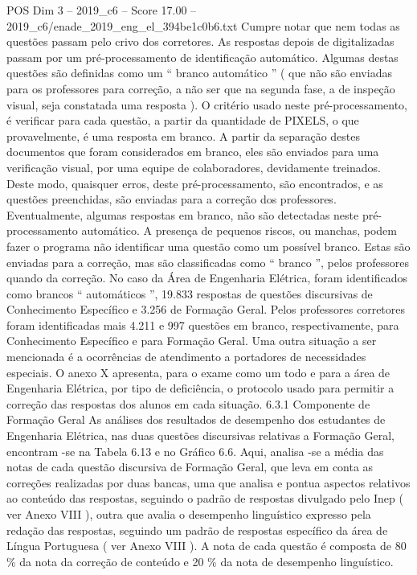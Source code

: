 \begin{textsample}{POS Dim 3 – 2019\_c6 – Score 17.00 – 2019\_c6/enade\_2019\_eng\_el\_394be1c0b6.txt}
Cumpre notar que nem todas as questões passam pelo crivo dos corretores.
As respostas depois de digitalizadas passam por um pré-processamento de identificação automático.
Algumas destas questões são definidas como um “ branco automático ” ( que não são enviadas para os professores para correção, a não ser que na segunda fase, a de inspeção visual, seja constatada uma resposta ).
O critério usado neste pré-processamento, é verificar para cada questão, a partir da quantidade de PIXELS, o que provavelmente, é uma resposta em branco.
A partir da separação destes documentos que foram considerados em branco, eles são enviados para uma verificação visual, por uma equipe de colaboradores, devidamente treinados.
Deste modo, quaisquer erros, deste pré-processamento, são encontrados, e as questões preenchidas, são enviadas para a correção dos professores.
Eventualmente, algumas respostas em branco, não são detectadas neste pré-processamento automático.
A presença de pequenos riscos, ou manchas, podem fazer o programa não identificar uma questão como um possível branco.
Estas são enviadas para a correção, mas são classificadas como “ branco ”, pelos professores quando da correção.
No caso da Área de Engenharia Elétrica, foram identificados como brancos “ automáticos ”, 19.833 respostas de questões discursivas de Conhecimento Específico e 3.256 de Formação Geral.
Pelos professores corretores foram identificadas mais 4.211 e 997 questões em branco, respectivamente, para Conhecimento Específico e para Formação Geral.
Uma outra situação a ser mencionada é a ocorrências de atendimento a portadores de necessidades especiais.
O anexo X apresenta, para o exame como um todo e para a área de Engenharia Elétrica, por tipo de deficiência, o protocolo usado para permitir a correção das respostas dos alunos em cada situação. 6.3.1 Componente de Formação Geral As análises dos resultados de desempenho dos estudantes de Engenharia Elétrica, nas duas questões discursivas relativas a Formação Geral, encontram -se na Tabela 6.13 e no Gráfico 6.6.
Aqui, analisa -se a média das notas de cada questão discursiva de Formação Geral, que leva em conta as correções realizadas por duas bancas, uma que analisa e pontua aspectos relativos ao conteúdo das respostas, seguindo o padrão de respostas divulgado pelo Inep ( ver Anexo VIII ), outra que avalia o desempenho linguístico expresso pela redação das respostas, seguindo um padrão de respostas específico da área de Língua Portuguesa ( ver Anexo VIII ).
A nota de cada questão é composta de 80 \% da nota da correção de conteúdo e 20 \% da nota de desempenho linguístico.

\end{textsample}
